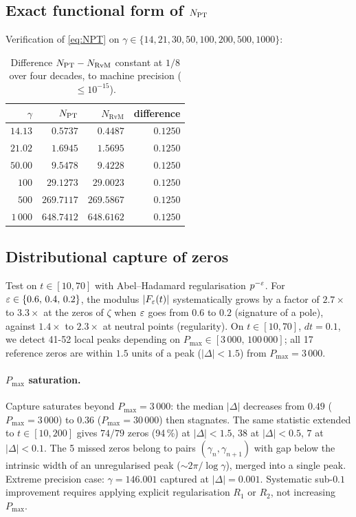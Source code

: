 \subsection{Exact functional form of $N_{\mathrm{PT}}$}
\label{sec:verif_NPT}

Verification of \eqref{eq:NPT} on
$\gamma \in \{14, 21, 30, 50, 100, 200, 500, 1000\}$:

\begin{table}[ht]
\centering
\begin{tabular}{@{}rrrr@{}}
\toprule
$\gamma$ & $N_{\mathrm{PT}}$ & $N_{\mathrm{RvM}}$ & difference\\
\midrule
$14.13$ & $0.5737$ & $0.4487$ & $0.1250$\\
$21.02$ & $1.6945$ & $1.5695$ & $0.1250$\\
$50.00$ & $9.5478$ & $9.4228$ & $0.1250$\\
$100$ & $29.1273$ & $29.0023$ & $0.1250$\\
$500$ & $269.7117$ & $269.5867$ & $0.1250$\\
$1\,000$ & $648.7412$ & $648.6162$ & $0.1250$\\
\bottomrule
\end{tabular}
\caption{Difference $N_{\mathrm{PT}} - N_{\mathrm{RvM}}$ constant at $1/8$ over four
decades, to machine precision ($\le 10^{-15}$).}
\label{tab:verif_residu}
\end{table}

\subsection{Distributional capture of zeros}
\label{sec:verif_capture}

Test on $t \in [10, 70]$ with Abel--Hadamard regularisation $p^{-\varepsilon}$.
For $\varepsilon \in \{0.6,\,0.4,\,0.2\}$, the modulus $|F_\varepsilon(t)|$
systematically grows by a factor of $2.7\times$ to $3.3\times$ at
the zeros of $\zeta$ when $\varepsilon$ goes from $0.6$ to $0.2$ (signature
of a pole), against $1.4\times$ to $2.3\times$ at neutral points
(regularity). On $t \in [10, 70]$, $dt = 0.1$, we detect 41-52 local
peaks depending on $P_{\max} \in [3\,000,\, 100\,000]$; all 17
reference zeros are within $1.5$ units of a peak ($|\Delta| < 1.5$)
from $P_{\max} = 3\,000$.

\paragraph{$P_{\max}$ saturation.}
Capture saturates beyond $P_{\max} = 3\,000$: the median $|\Delta|$
decreases from $0.49$ ($P_{\max} = 3\,000$) to $0.36$ ($P_{\max} = 30\,000$)
then stagnates. The same statistic extended to $t \in [10, 200]$
gives $74/79$ zeros (94\,\%) at $|\Delta| < 1.5$, $38$ at
$|\Delta| < 0.5$, $7$ at $|\Delta| < 0.1$. The 5 missed zeros
belong to pairs $(\gamma_n, \gamma_{n+1})$ with gap below the
intrinsic width of an unregularised peak ($\sim 2\pi/\log\gamma$),
merged into a single peak. Extreme precision case:
$\gamma = 146.001$ captured at $|\Delta| = 0.001$. Systematic
sub-$0.1$ improvement requires applying explicit regularisation
$R_1$ or $R_2$, not increasing $P_{\max}$.

